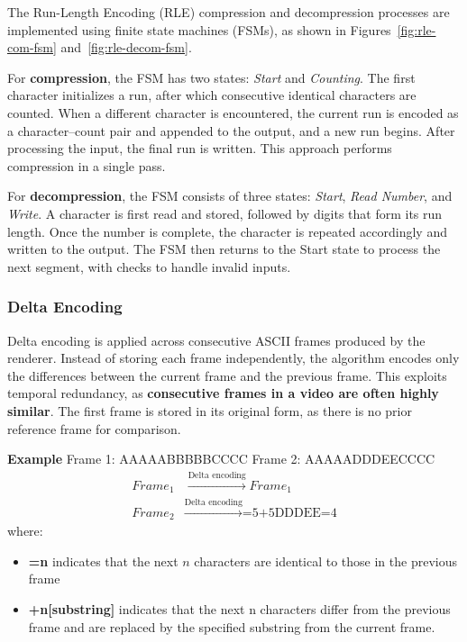 \noindent The Run-Length Encoding (RLE) compression and decompression processes are implemented using finite state machines (FSMs), as shown in Figures~\ref{fig:rle-com-fsm} and~\ref{fig:rle-decom-fsm}.

\vspace{0.3em}
\noindent For \textbf{compression}, the FSM has two states: \textit{Start} and \textit{Counting}. The first character initializes a run, after which consecutive identical characters are counted. When a different character is encountered, the current run is encoded as a character–count pair and appended to the output, and a new run begins. After processing the input, the final run is written. This approach performs compression in a single pass.

\vspace{0.3em}
\noindent For \textbf{decompression}, the FSM consists of three states: \textit{Start}, \textit{Read Number}, and \textit{Write}. A character is first read and stored, followed by digits that form its run length. Once the number is complete, the character is repeated accordingly and written to the output. The FSM then returns to the Start state to process the next segment, with checks to handle invalid inputs.

\subsubsection{Delta Encoding}
Delta encoding is applied across consecutive ASCII frames produced by the renderer. Instead of storing each frame independently, the algorithm encodes only the differences between the current frame and the previous frame. This exploits temporal redundancy, as \textbf{consecutive frames in a video are often highly similar}. The first frame is stored in its original form, as there is no prior reference frame for comparison.

\vspace{0.5em}
\noindent\textbf{Example} \newline
Frame 1: AAAAABBBBBCCCC \newline
Frame 2: AAAAADDDEECCCC \newline
\[
\begin{aligned}
Frame_1 &\xrightarrow{\text{Delta encoding}} Frame_1  \\
Frame_2 &\xrightarrow{\text{Delta encoding}} \text{=5+5DDDEE=4}
\end{aligned}
\]
where:
\begin{itemize}
    \item \textbf{=n} indicates that the next $n$ characters are identical to those in the previous frame
    \item \textbf{+n[substring]} indicates that the next n characters differ from the previous frame and are replaced by the specified substring from the current frame.
\end{itemize}

